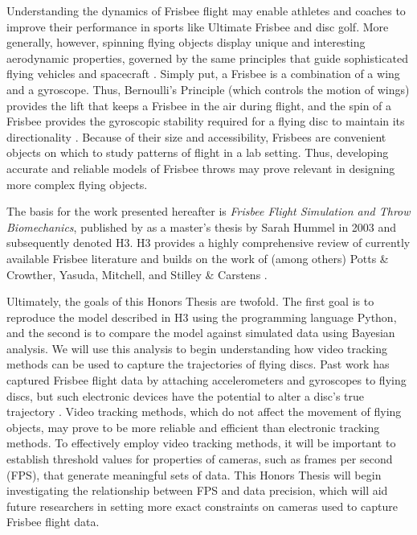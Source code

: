 \documentclass[a4paper,12pt, oneside]{article}
\begin{document}
Understanding the dynamics of Frisbee flight may enable athletes and coaches to improve their performance in sports like Ultimate Frisbee and disc golf.  More generally, however, spinning flying objects display unique and interesting aerodynamic properties, governed by the same principles that guide sophisticated flying vehicles and spacecraft \cite{lorenz2004}. Simply put, a Frisbee is a combination of a wing and a gyroscope. Thus, Bernoulli's Principle (which controls the motion of wings) provides the lift that keeps a Frisbee in the air during flight, and the spin of a Frisbee provides the gyroscopic stability required for a flying disc to maintain its directionality \cite{morrison}. Because of their size and accessibility, Frisbees are convenient objects on which to study patterns of flight in a lab setting. Thus, developing accurate and reliable models of Frisbee throws may prove relevant in designing more complex flying objects. 
 
The basis for the work presented hereafter is \textit{Frisbee Flight Simulation and Throw Biomechanics}, published by as a master's thesis by Sarah Hummel in 2003 and subsequently denoted H3. H3 provides a highly comprehensive review of currently available Frisbee literature and builds on the work of (among others) Potts \& Crowther, Yasuda, Mitchell, and Stilley \& Carstens \cite{H3, pottsandcrowther2007, yasuda, mitchell, stilleyandcarstens}. 

Ultimately, the goals of this Honors Thesis are twofold. The first goal is to reproduce the model described in H3 using the programming language Python, and the second is to compare the model against simulated data using Bayesian analysis. We will use this analysis to begin understanding how video tracking methods can be used to capture the trajectories of flying discs. Past work has captured Frisbee flight data by attaching accelerometers and gyroscopes to flying discs, but such electronic devices have the potential to alter a disc's true trajectory \cite{lorenz2004}. Video tracking methods, which do not affect the movement of flying objects, may prove to be more reliable and efficient than electronic tracking methods. To effectively employ video tracking methods, it will be important to establish threshold values for properties of cameras, such as frames per second (FPS), that generate meaningful sets of data. This Honors Thesis will begin investigating the relationship between FPS and data precision, which will aid future researchers in setting more exact constraints on cameras used to capture Frisbee flight data. \cite{hogg2010data}
\end{document}

